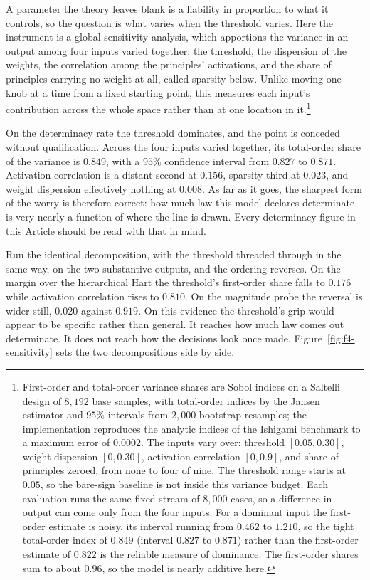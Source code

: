 A parameter the theory leaves blank is a liability in proportion to what
it controls, so the question is what varies when the threshold varies.
Here the instrument is a global sensitivity analysis, which apportions the
variance in an output among four inputs varied together: the threshold,
the dispersion of the weights, the correlation among the principles'
activations, and the share of principles carrying no weight at all, called
sparsity below.
Unlike moving one knob at a time from a fixed starting point, this
measures each input's contribution across the whole space rather than at
one location in it.\footnote{First-order and total-order variance shares
are Sobol indices on a Saltelli design of $8{,}192$ base samples, with
total-order indices by the Jansen estimator and $95\%$ intervals from
$2{,}000$ bootstrap resamples; the implementation reproduces the analytic
indices of the Ishigami benchmark to a maximum error of $0.0002$. The
inputs vary over: threshold $[0.05, 0.30]$, weight dispersion
$[0, 0.30]$, activation correlation $[0, 0.9]$, and share of principles
zeroed, from none to four of nine. The threshold range starts at $0.05$,
so the bare-sign baseline is not inside this variance budget. Each
evaluation runs the same fixed stream of $8{,}000$ cases, so a difference
in output can come only from the four inputs. For a dominant input the
first-order estimate is noisy, its interval running from $0.462$ to
$1.210$, so the tight total-order index of $0.849$ (interval $0.827$ to
$0.871$) rather than the first-order estimate of $0.822$ is the reliable
measure of dominance. The first-order shares sum to about $0.96$, so the
model is nearly additive here.}

On the determinacy rate the threshold dominates, and the point is
conceded without qualification. Across the four inputs varied together, its
total-order share of the variance is $0.849$, with a $95\%$ confidence
interval from $0.827$ to $0.871$. Activation correlation is a distant second at
$0.156$, sparsity third at $0.023$, and weight dispersion effectively
nothing at $0.008$. As far as it goes, the sharpest form of the worry is therefore correct: how
much law this model declares determinate is very nearly a function of where
the line is drawn. Every determinacy figure in this Article should be read
with that in mind.

Run the identical decomposition, with the threshold threaded through in
the same way, on the two substantive outputs, and the ordering reverses.
On the margin over the hierarchical Hart the threshold's first-order
share falls to $0.176$ while activation correlation rises to $0.810$. On
the magnitude probe the reversal is wider still, $0.020$ against $0.919$.
On this evidence the threshold's grip would appear to be specific rather
than general. It reaches how much law comes out determinate. It does not
reach how the decisions look once made.
Figure~\ref{fig:f4-sensitivity} sets the two decompositions side by side.

